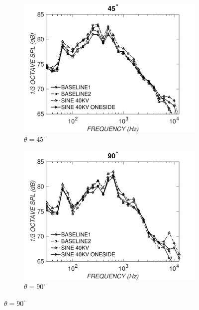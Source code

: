 \begin{figure}
\begin{center}
\begin{subfigure}{0.5\textwidth}
\includegraphics[width=\linewidth]{figures/octave45}
\caption{$\theta=45^\circ$}
\label{fig:octave45}
\end{subfigure}

\hspace*{\fill} %

\begin{subfigure}{0.5\textwidth}
\includegraphics[width=\linewidth]{figures/octave90}
\caption{$\theta=90^\circ$}
\label{fig:octave90}
\end{subfigure}


\end{center}
\end{figure}
